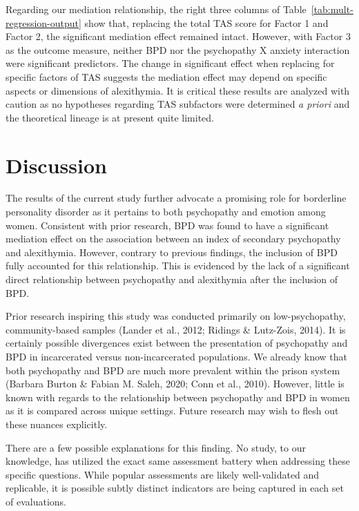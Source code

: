 \documentclass[
  man,floatsintext]{apa7}
\begin{document}
Regarding our mediation relationship, the right three columns of Table~\ref{tab:mult-regression-output} show that, replacing the total TAS score for Factor 1 and Factor 2, the significant mediation effect remained intact. However, with Factor 3 as the outcome measure, neither BPD nor the psychopathy X anxiety interaction were significant predictors. The change in significant effect when replacing for specific factors of TAS suggests the mediation effect may depend on specific aspects or dimensions of alexithymia. It is critical these results are analyzed with caution as no hypotheses regarding TAS subfactors were determined \emph{a priori} and the theoretical lineage is at present quite limited.

\hypertarget{discussion}{%
\section{Discussion}\label{discussion}}

The results of the current study further advocate a promising role for borderline personality disorder as it pertains to both psychopathy and emotion among women. Consistent with prior research, BPD was found to have a significant mediation effect on the association between an index of secondary psychopathy and alexithymia. However, contrary to previous findings, the inclusion of BPD fully accounted for this relationship. This is evidenced by the lack of a significant direct relationship between psychopathy and alexithymia after the inclusion of BPD.

Prior research inspiring this study was conducted primarily on low-psychopathy, community-based samples (Lander et al., 2012; Ridings \& Lutz-Zois, 2014). It is certainly possible divergences exist between the presentation of psychopathy and BPD in incarcerated versus non-incarcerated populations. We already know that both psychopathy and BPD are much more prevalent within the prison system (Barbara Burton \& Fabian M. Saleh, 2020; Conn et al., 2010). However, little is known with regards to the relationship between psychopathy and BPD in women as it is compared across unique settings. Future research may wish to flesh out these nuances explicitly.

There are a few possible explanations for this finding. No study, to our knowledge, has utilized the exact same assessment battery when addressing these specific questions. While popular assessments are likely well-validated and replicable, it is possible subtly distinct indicators are being captured in each set of evaluations.
\end{document}
